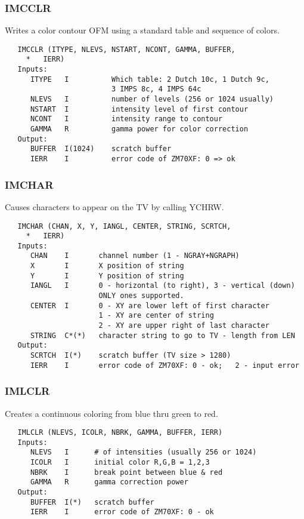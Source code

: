 \subsubsection{IMCCLR}
Writes a color contour OFM using a standard table and
sequence of colors.
\begin{verbatim}
   IMCCLR (ITYPE, NLEVS, NSTART, NCONT, GAMMA, BUFFER,
     *   IERR)
   Inputs:
      ITYPE   I          Which table: 2 Dutch 10c, 1 Dutch 9c,
                         3 IMPS 8c, 4 IMPS 64c
      NLEVS   I          number of levels (256 or 1024 usually)
      NSTART  I          intensity level of first contour
      NCONT   I          intensity range to contour
      GAMMA   R          gamma power for color correction
   Output:
      BUFFER  I(1024)    scratch buffer
      IERR    I          error code of ZM70XF: 0 => ok
\end{verbatim}

\subsubsection{IMCHAR}
Causes characters to appear on the TV by calling YCHRW.
\begin{verbatim}
   IMCHAR (CHAN, X, Y, IANGL, CENTER, STRING, SCRTCH,
     *   IERR)
   Inputs:
      CHAN    I       channel number (1 - NGRAY+NGRAPH)
      X       I       X position of string
      Y       I       Y position of string
      IANGL   I       0 - horizontal (to right), 3 - vertical (down)
                      ONLY ones supported.
      CENTER  I       0 - XY are lower left of first character
                      1 - XY are center of string
                      2 - XY are upper right of last character
      STRING  C*(*)   character string to go to TV - length from LEN
   Output:
      SCRTCH  I(*)    scratch buffer (TV size > 1280)
      IERR    I       error code of ZM70XF: 0 - ok;   2 - input error
\end{verbatim}

\subsubsection{IMLCLR}
Creates a continuous coloring from blue thru green to red.
\begin{verbatim}
   IMLCLR (NLEVS, ICOLR, NBRK, GAMMA, BUFFER, IERR)
   Inputs:
      NLEVS   I      # of intensities (usually 256 or 1024)
      ICOLR   I      initial color R,G,B = 1,2,3
      NBRK    I      break point between blue & red
      GAMMA   R      gamma correction power
   Output:
      BUFFER  I(*)   scratch buffer
      IERR    I      error code of ZM70XF: 0 - ok
\end{verbatim}

